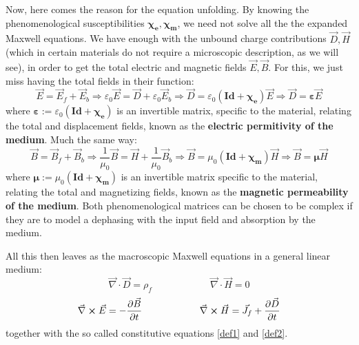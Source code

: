 \documentclass[11pt, a4paper, twoside]{article} %
\begin{document}
Now, here comes the reason for the equation unfolding. By knowing the phenomenological susceptibilities $\pmb{\chi_e},\pmb{\chi_m}$, we need not solve all the the expanded Maxwell equations. We have enough with the unbound charge contributions $\vec{D},\vec{H}$ (which in certain materials do not require a microscopic description, as we will see), in order to get the total electric and magnetic fields $\vec{E},\vec{B}$. For this, we just miss having the total fields in their function:
\begin{equation}\label{def1}
\vec{E}=\vec{E}_f+\vec{E}_b \Longrightarrow \varepsilon_0\vec{E}=\vec{D}+\varepsilon_0\vec{E}_b\Longrightarrow \vec{D}=\varepsilon_0(\pmb{Id}+\pmb{\chi_e})\vec{E} \Longrightarrow \vec{D}=\pmb{\varepsilon}\vec{E}
\end{equation} 
where $\pmb{\varepsilon}:=\varepsilon_0(\pmb{Id}+\pmb{\chi_e})$ is an invertible matrix, specific to the material, relating the total and displacement fields, known as the {\bf electric permitivity of the medium}. Much the same way:
\begin{equation}\label{def2}
\vec{B}=\vec{B}_f+\vec{B}_b \Longrightarrow \frac{1}{\mu_0}\vec{B}=\vec{H}+\frac{1}{\mu_0}\vec{B}_b\Longrightarrow \vec{B}=\mu_0(\pmb{Id}+\pmb{\chi_m})\vec{H}\Longrightarrow \vec{B}=\pmb{\mu} \vec{H}
\end{equation} 
where $\pmb{\mu}:=\mu_0(\pmb{Id}+\pmb{\chi_m})$ is an invertible matrix specific to the material, relating the total and magnetizing fields, known as the {\bf magnetic permeability of the medium}. Both phenomenological matrices can be chosen to be complex if they are to model a dephasing with the input field and absorption by the medium.

All this then leaves as the macroscopic Maxwell equations in a general linear medium: 
\begin{equation}\label{div2}
\vec{\nabla}\cdot \vec{D}=\rho_f \quad \quad \quad \quad \quad \quad \vec{\nabla}\cdot \vec{H}=0
\end{equation}
\begin{equation}\label{curl2}
\vec{\nabla}\cross \vec{E}=-\pdv{\vec{B}}{t} \quad \quad \quad \quad \quad \quad \vec{\nabla}\cross \vec{H}=\vec{J}_f+\pdv{\vec{D}}{t}
\end{equation}
together with the so called constitutive equations \eqref{def1} and \eqref{def2}.
\end{document}
